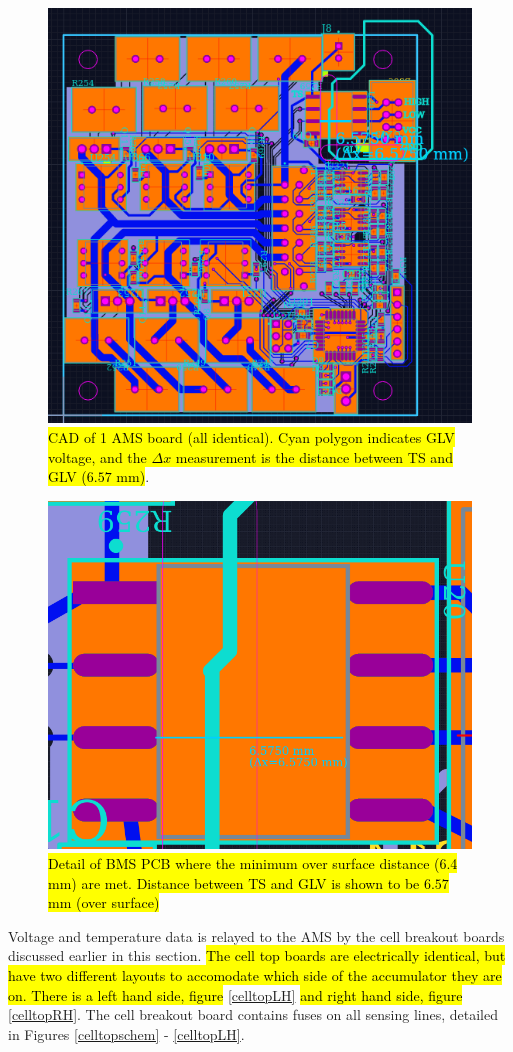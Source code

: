 \documentclass{article}
\DeclareRobustCommand{\hlr}[1]{{\sethlcolor{red}\hl{#1}}}
\begin{document}
            \begin{figure}[H]
                \centering
                \includegraphics[width = 0.7 \textwidth]{bms_final1_PCBCAD}
                \caption{\hlr{CAD of 1 AMS board (all identical). Cyan polygon indicates GLV voltage, and the $\Delta x$ measurement is the distance between TS and GLV ($6.57$ mm)}.}
                \label{bmspcb}
            \end{figure}


            \begin{figure}[H]
                \centering
                \includegraphics[width=0.5 \textwidth]{bms_separation_detail}
                \caption{\hlr{Detail of BMS PCB where the minimum over surface distance (6.4 mm) are met. Distance between TS and GLV is shown to be $6.57$ mm (over surface)}}
                \label{creepage}
            \end{figure}

            Voltage and temperature data is relayed to the AMS by the cell breakout boards discussed earlier in this section. \hlr{The cell top boards are electrically identical, but have two different layouts to accomodate which side of the accumulator they are on. There is a left hand side, figure} \ref{celltopLH}\hlr{ and right hand side, figure} \ref{celltopRH}. The cell breakout board contains fuses on all sensing lines, detailed in Figures \ref{celltopschem} - \ref{celltopLH}.
\end{document}
